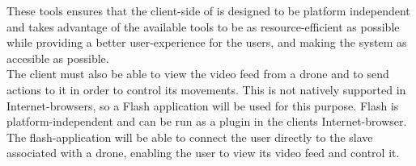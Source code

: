 These tools ensures that the client-side of \projectname{} is designed to be platform independent and takes advantage of the available tools to be as resource-efficient as possible while providing a better user-experience for the users, and making the system as accesible as possible. \\

The client must also be able to view the video feed from a drone and to send actions to it in order to control its movements. 
This is not natively supported in Internet-browsers, so a Flash application will be used for this purpose. 
Flash is platform-independent and can be run as a plugin in the clients Internet-browser.
The flash-application will be able to connect the user directly to the slave associated with a drone, enabling the user to view its video feed and control it.


